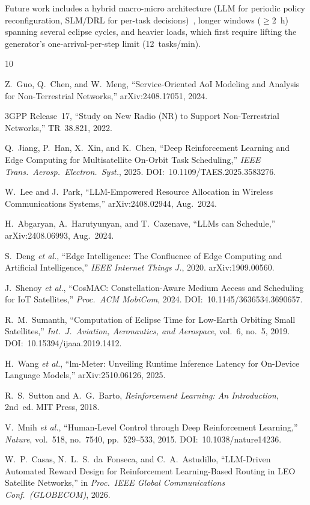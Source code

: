 \documentclass[conference,comsoc,twoside,caption=false]{IEEEtran}
\theoremstyle{definition}
\begin{document}
Future work includes a hybrid macro-micro architecture (LLM for periodic
policy reconfiguration, SLM/DRL for per-task decisions)~\cite{lee2024}, longer
windows ($\geq$2~h) spanning several eclipse cycles, and heavier
loads, which first require lifting the generator's one-arrival-per-step limit
(12~tasks/min).

\FloatBarrier
\begin{thebibliography}{10}

Z.~Guo, Q.~Chen, and W.~Meng,
``Service-Oriented AoI Modeling and Analysis for Non-Terrestrial Networks,''
arXiv:2408.17051, 2024.

3GPP Release~17,
``Study on New Radio (NR) to Support Non-Terrestrial Networks,''
TR~38.821, 2022.

Q.~Jiang, P.~Han, X.~Xin, and K.~Chen,
``Deep Reinforcement Learning and Edge Computing for Multisatellite On-Orbit
Task Scheduling,''
\emph{IEEE Trans.\ Aerosp.\ Electron.\ Syst.}, 2025.
DOI:~10.1109/TAES.2025.3583276.

W.~Lee and J.~Park,
``LLM-Empowered Resource Allocation in Wireless Communications Systems,''
arXiv:2408.02944, Aug.\ 2024.

H.~Abgaryan, A.~Harutyunyan, and T.~Cazenave,
``LLMs can Schedule,''
arXiv:2408.06993, Aug.\ 2024.

S.~Deng \emph{et al.},
``Edge Intelligence: The Confluence of Edge Computing and Artificial
Intelligence,''
\emph{IEEE Internet Things J.}, 2020.
arXiv:1909.00560.

J.~Shenoy \emph{et al.},
``CosMAC: Constellation-Aware Medium Access and Scheduling for IoT
Satellites,''
\emph{Proc.\ ACM MobiCom}, 2024.
DOI:~10.1145/3636534.3690657.

R.~M.~Sumanth,
``Computation of Eclipse Time for Low-Earth Orbiting Small Satellites,''
\emph{Int.\ J.\ Aviation, Aeronautics, and Aerospace}, vol.~6, no.~5, 2019.
DOI:~10.15394/ijaaa.2019.1412.

H.~Wang \emph{et al.},
``lm-Meter: Unveiling Runtime Inference Latency for On-Device Language
Models,''
arXiv:2510.06126, 2025.

R.~S.~Sutton and A.~G.~Barto,
\emph{Reinforcement Learning: An Introduction}, 2nd~ed.
MIT Press, 2018.

V.~Mnih \emph{et al.},
``Human-Level Control through Deep Reinforcement Learning,''
\emph{Nature}, vol.~518, no.~7540, pp.~529--533, 2015.
DOI:~10.1038/nature14236.

W.~P.~Casas, N.~L.~S.~da~Fonseca, and C.~A.~Astudillo,
``LLM-Driven Automated Reward Design for Reinforcement Learning-Based Routing
in LEO Satellite Networks,''
in \emph{Proc.\ IEEE Global Communications Conf.\ (GLOBECOM)}, 2026.

\end{thebibliography}
\end{document}
